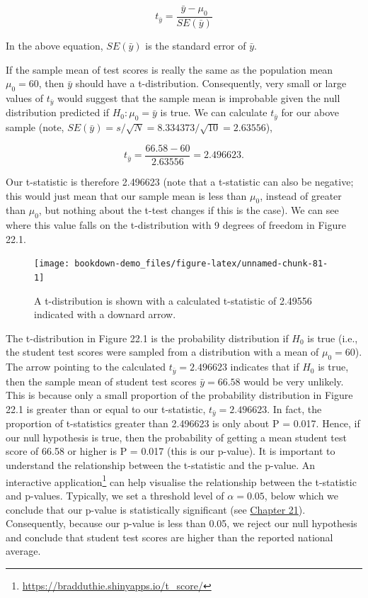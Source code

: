 \documentclass[
  openany]{scrbook}
\begin{document}
\[t_{\bar{y}} = \frac{\bar{y} - \mu_{0}}{SE(\bar{y})}\]

In the above equation, \(SE(\bar{y})\) is the standard error of \(\bar{y}\).

If the sample mean of test scores is really the same as the population mean \(\mu_{0} = 60\), then \(\bar{y}\) should have a t-distribution.
Consequently, very small or large values of \(t_{\bar{y}}\) would suggest that the sample mean is improbable given the null distribution predicted if \(H_{0}: \mu_{0} = \bar{y}\) is true.
We can calculate \(t_{\bar{y}}\) for our above sample (note, \(SE(\bar{y}) = s/\sqrt{N} = 8.334373 / \sqrt{10} = 2.63556\)),

\[t_{\bar{y}} = \frac{66.58 - 60}{2.63556} = 2.496623.\]

Our t-statistic is therefore 2.496623 (note that a t-statistic can also be negative; this would just mean that our sample mean is less than \(\mu_{0}\), instead of greater than \(\mu_{0}\), but nothing about the t-test changes if this is the case).
We can see where this value falls on the t-distribution with 9 degrees of freedom in Figure 22.1.

\begin{figure}
\texttt{[image: bookdown-demo\_files/figure-latex/unnamed-chunk-81-1]} \caption{A t-distribution is shown with a calculated t-statistic of 2.49556 indicated with a downard arrow.}\label{fig:unnamed-chunk-81}
\end{figure}

The t-distribution in Figure 22.1 is the probability distribution if \(H_{0}\) is true (i.e., the student test scores were sampled from a distribution with a mean of \(\mu_{0} = 60\)).
The arrow pointing to the calculated \(t_{\bar{y}} = 2.496623\) indicates that if \(H_{0}\) is true, then the sample mean of student test scores \(\bar{y} = 66.58\) would be very unlikely.
This is because only a small proportion of the probability distribution in Figure 22.1 is greater than or equal to our t-statistic, \(t_{\bar{y}} = 2.496623\).
In fact, the proportion of t-statistics greater than 2.496623 is only about P = 0.017.
Hence, if our null hypothesis is true, then the probability of getting a mean student test score of 66.58 or higher is P = 0.017 (this is our p-value).
It is important to understand the relationship between the t-statistic and the p-value.
An interactive application\footnote{\url{https://bradduthie.shinyapps.io/t_score/}} can help visualise the relationship between the t-statistic and p-values.
Typically, we set a threshold level of \(\alpha = 0.05\), below which we conclude that our p-value is statistically significant (see \protect\hyperlink{Chapter_21}{Chapter 21}).
Consequently, because our p-value is less than 0.05, we reject our null hypothesis and conclude that student test scores are higher than the reported national average.
\end{document}
